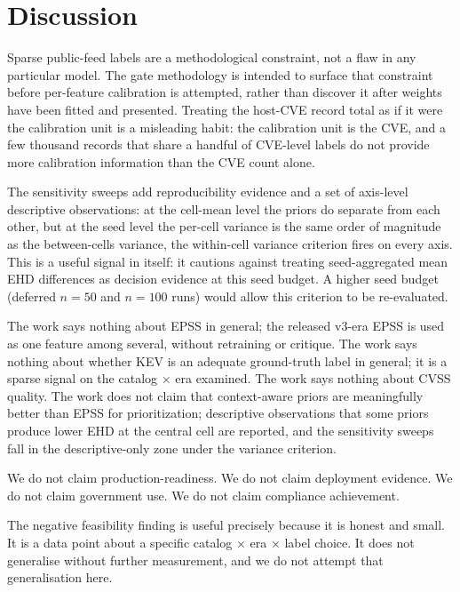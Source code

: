 \section{Discussion}
Sparse public-feed labels are a methodological constraint, not a flaw in any particular model. The gate methodology is intended to surface that constraint before per-feature calibration is attempted, rather than discover it after weights have been fitted and presented. Treating the host-CVE record total as if it were the calibration unit is a misleading habit: the calibration unit is the CVE, and a few thousand records that share a handful of CVE-level labels do not provide more calibration information than the CVE count alone.

The sensitivity sweeps add reproducibility evidence and a set of axis-level descriptive observations: at the cell-mean level the priors do separate from each other, but at the seed level the per-cell variance is the same order of magnitude as the between-cells variance, the within-cell variance criterion fires on every axis. This is a useful signal in itself: it cautions against treating seed-aggregated mean EHD differences as decision evidence at this seed budget. A higher seed budget (deferred $n = 50$ and $n = 100$ runs) would allow this criterion to be re-evaluated.

The work says nothing about EPSS in general; the released v3-era EPSS is used as one feature among several, without retraining or critique. The work says nothing about whether KEV is an adequate ground-truth label in general; it is a sparse signal on the catalog $\times$ era examined. The work says nothing about CVSS quality. The work does not claim that context-aware priors are meaningfully better than EPSS for prioritization; descriptive observations that some priors produce lower EHD at the central cell are reported, and the sensitivity sweeps fall in the descriptive-only zone under the variance criterion.

We do not claim production-readiness. We do not claim deployment evidence. We do not claim government use. We do not claim compliance achievement.

The negative feasibility finding is useful precisely because it is honest and small. It is a data point about a specific catalog × era × label choice. It does not generalise without further measurement, and we do not attempt that generalisation here.
